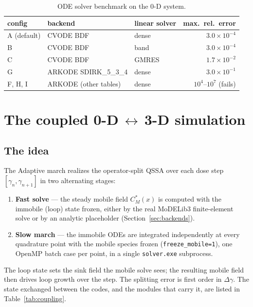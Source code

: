 \documentclass[11pt]{article}
\newcommand{\MoD}{\textsf{MoDELib3}}
\newcommand{\code}[1]{\texttt{\small #1}}
\newcommand{\file}[1]{\texttt{\footnotesize #1}}
\begin{document}
\begin{table}[htbp]
\centering
\caption{ODE solver benchmark on the 0-D system.}
\label{tab:odebench}
\begin{tabular}{@{}lllr@{}}
\toprule
config & backend & linear solver & max.\ rel.\ error \\
\midrule
A (default) & CVODE BDF & dense & $3.0\times10^{-4}$ \\
B & CVODE BDF & band  & $3.0\times10^{-4}$ \\
C & CVODE BDF & GMRES & $1.7\times10^{-2}$ \\
G & ARKODE SDIRK\_5\_3\_4 & dense & $3.0\times10^{-1}$ \\
F, H, I & ARKODE (other tables) & dense & $10^{4}$--$10^{7}$ (fails) \\
\bottomrule
\end{tabular}
\end{table}

\section{The coupled 0-D$\,\leftrightarrow\,$3-D simulation}
\label{sec:coupled}

\subsection{The idea}

The Adaptive march realizes the operator-split QSSA over each dose step
$[\gamma_n, \gamma_{n+1}]$ in two alternating stages:

\begin{enumerate}
\item \textbf{Fast solve} --- the steady mobile field $C_M^{*}(x)$ is
computed with the immobile (loop) state frozen, either by the real \MoD{}
finite-element solve or by an analytic placeholder
(Section~\ref{sec:backends}).
\item \textbf{Slow march} --- the immobile ODEs are integrated independently
at every quadrature point with the mobile species frozen
(\code{freeze\_mobile=1}), one OpenMP batch case per point, in a single
\file{solver.exe} subprocess.
\end{enumerate}

The loop state sets the sink field the mobile solve sees; the resulting
mobile field then drives loop growth over the step. The splitting error is
first order in $\Delta\gamma$. The state exchanged between the codes, and
the modules that carry it, are listed in Table~\ref{tab:coupling}.
\end{document}

